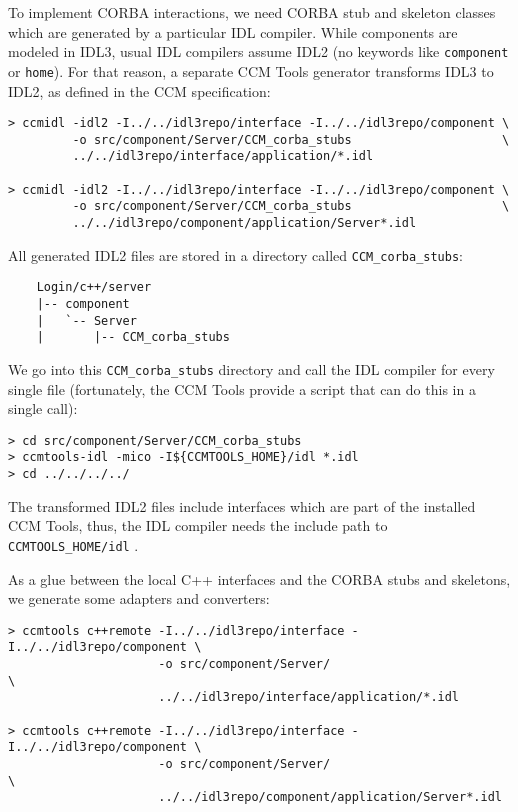 \vspace{3mm}
To implement CORBA interactions, we need CORBA stub and skeleton classes which
are generated by a particular IDL compiler. While components are modeled in
IDL3, usual IDL compilers assume IDL2 (no keywords like {\tt component} or 
{\tt home}).
For that reason, a separate CCM Tools generator transforms IDL3 to IDL2, as defined in
the CCM specification:
\begin{footnotesize}
\begin{verbatim}
> ccmidl -idl2 -I../../idl3repo/interface -I../../idl3repo/component \
         -o src/component/Server/CCM_corba_stubs                     \  
         ../../idl3repo/interface/application/*.idl

> ccmidl -idl2 -I../../idl3repo/interface -I../../idl3repo/component \
         -o src/component/Server/CCM_corba_stubs                     \
         ../../idl3repo/component/application/Server*.idl
\end{verbatim}
\end{footnotesize}

All generated IDL2 files are stored in a directory called {\tt CCM\_corba\_stubs}:
\begin{footnotesize}
\begin{verbatim}
    Login/c++/server
    |-- component
    |   `-- Server
    |       |-- CCM_corba_stubs
\end{verbatim}
\end{footnotesize}

We go into this {\tt CCM\_corba\_stubs} directory and call the IDL compiler for
every single file (fortunately, the CCM Tools provide a script that can do this
in a single call):
\begin{footnotesize}
\begin{verbatim}
> cd src/component/Server/CCM_corba_stubs
> ccmtools-idl -mico -I${CCMTOOLS_HOME}/idl *.idl
> cd ../../../../
\end{verbatim}
\end{footnotesize}

The transformed IDL2 files include interfaces which are part of the
installed CCM Tools, thus, the IDL compiler needs the include path to {\tt CCMTOOLS\_HOME/idl} .

\vspace{3mm}
As a glue between the local C++ interfaces and the CORBA stubs and skeletons, we
generate some adapters and converters:
\begin{footnotesize}
\begin{verbatim}
> ccmtools c++remote -I../../idl3repo/interface -I../../idl3repo/component \
                     -o src/component/Server/                              \
                     ../../idl3repo/interface/application/*.idl

> ccmtools c++remote -I../../idl3repo/interface -I../../idl3repo/component \
                     -o src/component/Server/                              \
                     ../../idl3repo/component/application/Server*.idl
\end{verbatim}
\end{footnotesize}

